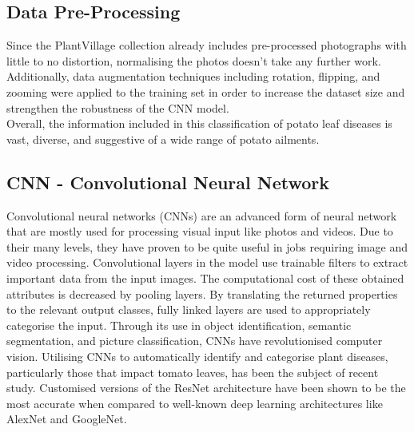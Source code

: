 \documentclass[conference]{IEEEtran}
\begin{document}
\subsection{Data Pre-Processing}
Since the PlantVillage collection already includes pre-processed photographs with little to no distortion, normalising the photos doesn't take any further work.\\
Additionally, data augmentation techniques including rotation, flipping, and zooming were applied to the training set in order to increase the dataset size and strengthen the robustness of the CNN model.\\
Overall, the information included in this classification of potato leaf diseases is vast, diverse, and suggestive of a wide range of potato ailments.







\subsection{CNN - Convolutional Neural Network}

Convolutional neural networks (CNNs) are an advanced form of neural network that are mostly used for processing visual input like photos and videos. Due to their many levels, they have proven to be quite useful in jobs requiring image and video processing. Convolutional layers in the model use trainable filters to extract important data from the input images. The computational cost of these obtained attributes is decreased by pooling layers. By translating the returned properties to the relevant output classes, fully linked layers are used to appropriately categorise the input. Through its use in object identification, semantic segmentation, and picture classification, CNNs have revolutionised computer vision. Utilising CNNs to automatically identify and categorise plant diseases, particularly those that impact tomato leaves, has been the subject of recent study. Customised versions of the ResNet architecture have been shown to be the most accurate when compared to well-known deep learning architectures like AlexNet and GoogleNet.\\
\end{document}
